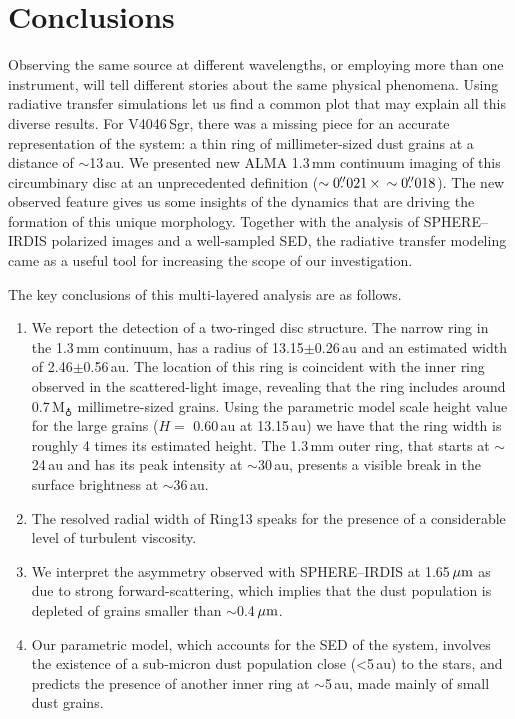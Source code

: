 \documentclass[fleqn,usenatbib,useAMS]{mnras}
\begin{document}
\section{Conclusions} \label{sec:Conclusions}

Observing the same source at different wavelengths, or employing more than one instrument, will tell different stories about the same physical phenomena. Using radiative transfer simulations let us find a common plot that may explain all this diverse results. For V4046\,Sgr, there was a missing piece for an accurate representation of the system: a thin ring of millimeter-sized dust grains at a distance of $\sim$13\,au. We presented new ALMA 1.3\,mm continuum imaging of this circumbinary disc at an unprecedented definition ($\sim0\hbox{$.\!\!^{\prime\prime}$}021 \, \times \, \sim0\hbox{$.\!\!^{\prime\prime}$}018$). The new observed feature gives us some insights of the dynamics that are driving the formation of this unique morphology. Together with the analysis of SPHERE--IRDIS polarized images and a well-sampled SED, the radiative transfer modeling came as a useful tool for increasing the scope of our investigation.

The key conclusions of this multi-layered analysis are as follows.
\begin{enumerate}
  \item We report the detection of a two-ringed disc structure. The narrow ring in the 1.3\,mm continuum, has a radius of 13.15$\pm$0.26\,au and an estimated width of 2.46$\pm$0.56\,au. The location of this ring is coincident with the inner ring observed in the scattered-light image, revealing that the ring includes around 0.7\,M$_{\earth}$ millimetre-sized grains. Using the parametric model scale height value for the large grains ($H=$ 0.60\,au at 13.15\,au) we have that the ring width is roughly 4 times its estimated height. The 1.3\,mm outer ring, that starts at $\sim$24\,au and has its peak intensity at $\sim$30\,au, presents a visible break in the surface brightness at $\sim$36\,au. 
  
  \item The resolved radial width of Ring13 speaks for the presence of a considerable level of turbulent viscosity.
  
  \item We interpret the asymmetry observed with SPHERE--IRDIS at 1.65\,$\hbox{$\mu$m}$ as due to strong forward-scattering, which implies that the dust population is depleted of grains smaller than $\sim$0.4\,$\hbox{$\mu$m}$.
  
  \item Our parametric model, which accounts for the SED of the system, involves the existence of a sub-micron dust population close (<5\,au) to the stars, and predicts the presence of another inner ring at $\sim$5\,au, made mainly of small dust grains.
    
\end{enumerate}
\end{document}
